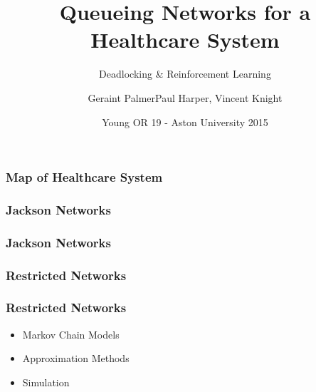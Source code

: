 \documentclass[xcolor={table}]{beamer}
\title
{Queueing Networks for a Healthcare System}
\subtitle
{Deadlocking \& Reinforcement Learning}
\author{Geraint Palmer\newline \scriptsize{Paul Harper, Vincent Knight}}
\date{Young OR 19 - Aston University 2015}
\begin{document}
\frame{\titlepage}




%     

%     


\begin{frame}
\frametitle{Map of Healthcare System}
\begin{figure}

\end{figure}
\end{frame}


\begin{frame}
  \frametitle{Jackson Networks}
  \begin{figure}
  
  \end{figure}
\end{frame}
\begin{frame}
  \frametitle{Jackson Networks}
  \begin{figure}
  
  \end{figure}
\end{frame}

\begin{frame}
  \frametitle{Restricted Networks}
  \begin{figure}
  
  \end{figure}
\end{frame}

\begin{frame}
  \frametitle{Restricted Networks}
  \begin{itemize}
    \item Markov Chain Models
    \item Approximation Methods
    \item Simulation
  \end{itemize}
\end{frame}
\end{document}
